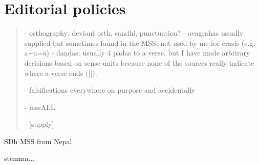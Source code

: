 \vfill
\pagebreak


\section{Editorial policies}

\begin{quote}
- orthography: deviant orth, sandhi, punctuation?
- avagrahas usually supplied but sometimes found in the MSS, not used by me for crasis (e.g. a+a=ā)
- daṇḍas: usually 4 pādas to a verse, but I have made arbitrary decisions based on sense-units 
  because none of the sources really indicate where a verse ends (||).
  
- falsifications everywhere on purpose and accidentally

- mssALL

- [supply]
\end{quote}

SDh MSS from Nepal

stemma...

